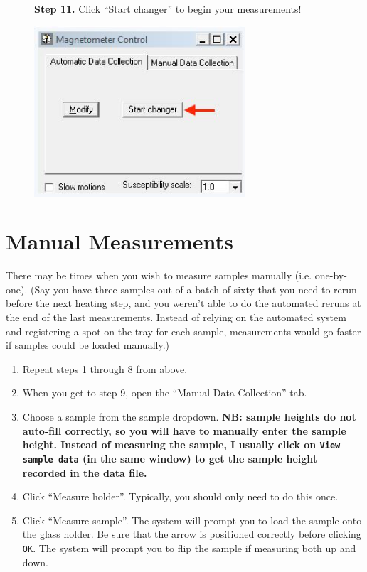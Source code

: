 \documentclass[11pt,letterpaper]{article}
\begin{document}
\begin{figure}
\begin{flushleft}
\textbf{Step 11.}
Click ``Start changer'' to begin your measurements!
\end{flushleft}
\centering
\includegraphics[width=0.7\textwidth]{images/Capture13.jpg}
\end{figure}

\clearpage

\section*{Manual Measurements}
There may be times when you wish to measure samples manually (i.e. one-by-one). (Say you have three samples out of a batch of sixty that you need to rerun before the next heating step, and you weren't able to do the automated reruns at the end of the last measurements. Instead of relying on the automated system and registering a spot on the tray for each sample, measurements would go faster if samples could be loaded manually.)

\begin{enumerate}
\item{Repeat steps 1 through 8 from above.}
\item{When you get to step 9, open the ``Manual Data Collection'' tab.}
\item{Choose a sample from the sample dropdown. \textbf{NB: sample heights do not auto-fill correctly, so you will have to manually enter the sample height. Instead of measuring the sample, I usually click on \texttt{View sample data} (in the same window) to get the sample height recorded in the data file.}}
\item{Click ``Measure holder''. Typically, you should only need to do this once.}
\item{Click ``Measure sample''. The system will prompt you to load the sample onto the glass holder. Be sure that the arrow is positioned correctly before clicking \texttt{OK}. The system will prompt you to flip the sample if measuring both up and down.}
\end{enumerate}
\end{document}
